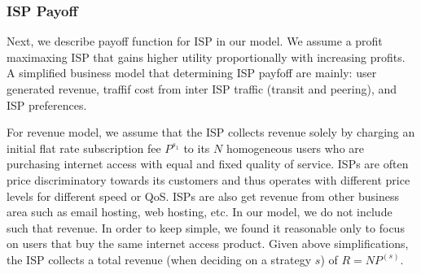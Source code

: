 \documentclass[paper]{ieice}
\begin{document}
\subsubsection{ISP Payoff}
Next, we describe payoff function for ISP in our model.  
We assume a profit maximaxing ISP that gains higher utility proportionally with increasing profits. 
A simplified business model that determining ISP payfoff are mainly: user generated revenue, traffif cost from inter ISP traffic (transit and peering), and ISP preferences.

For revenue model, we assume that the ISP collects revenue solely by charging an initial flat rate subscription fee $P^{s_1}$ to its $N$ homogeneous users who are purchasing internet access with equal and fixed quality of service.
ISPs are often price discriminatory towards its customers and thus operates with different price levels for different speed or QoS.
ISPs are also get revenue from other business area such as email hosting, web hosting, etc. 
In our model, we do not include such that revenue. 
In order to keep simple, we found it reasonable only to focus on users that buy the same internet access product. 
Given above simplifications, the ISP collects a total revenue (when deciding on a strategy $s$) of $R = N P^{(s)}$.
\end{document}
